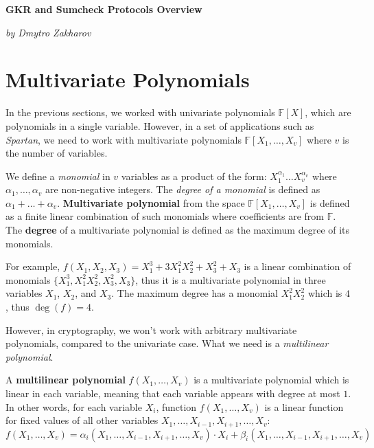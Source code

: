 \documentclass{gkr-template}
\begin{document}
\begin{center}
    \textbf{\Huge{GKR and Sumcheck Protocols Overview}}

    \textit{by Dmytro Zakharov}
\end{center}

\section*{Multivariate Polynomials}

In the previous sections, we worked with univariate polynomials $\mathbb{F}[X]$,
which are polynomials in a single variable. However, in a set of applications
such as \textit{Spartan}, we need to work with multivariate polynomials
$\mathbb{F}[X_1,\dots,X_v]$ where $v$ is the number of variables.

\begin{definition}
    We define a \textit{monomial} in $v$ variables as a product of the form:
    $X_1^{\alpha_1}\dots X_v^{\alpha_v}$ where $\alpha_1,\dots,\alpha_v$ are
    non-negative integers. The \textit{degree of a monomial} is defined as
    $\alpha_1+\dots+\alpha_v$. \textbf{Multivariate polynomial} from the space
    $\mathbb{F}[X_1,\dots,X_v]$ is defined as a finite linear combination of
    such monomials where coefficients are from $\mathbb{F}$. The \textbf{degree}
    of a multivariate polynomial is defined as the maximum degree of its
    monomials.
\end{definition}

\begin{example}
    For example, $f(X_1,X_2,X_3)=X_1^3 + 3X_1^2X_2^2 + X_3^2 + X_3$ is a linear
    combination of monomials $\{X_1^3,X_1^2X_2^2,X_3^2,X_3\}$, thus it is a
    multivariate polynomial in three variables $X_1$, $X_2$, and $X_3$. The
    maximum degree has a monomial $X_1^2X_2^2$ which is $4$, thus $\deg(f) = 4$.
\end{example}

However, in cryptography, we won't work with arbitrary multivariate
polynomials, compared to the univariate case. What we need is a 
\textit{multilinear polynomial}.
\begin{definition}
    A \textbf{multilinear polynomial} $f(X_1,\dots,X_v)$ is a multivariate
    polynomial which is linear in each variable, meaning that each variable
    appears with degree at most $1$. In other words, for each variable
    $X_i$, function $f(X_1,\dots,X_v)$ is a linear function for fixed 
    values of all other variables $X_1,\dots,X_{i-1},X_{i+1},\dots,X_v$:
    \begin{equation*}
        f(X_1,\dots,X_v) = \alpha_i(X_1,\dots,X_{i-1},X_{i+1},\dots,X_v) \cdot X_i + \beta_i(X_1,\dots,X_{i-1},X_{i+1},\dots,X_v)
    \end{equation*}
\end{definition}
\end{document}
